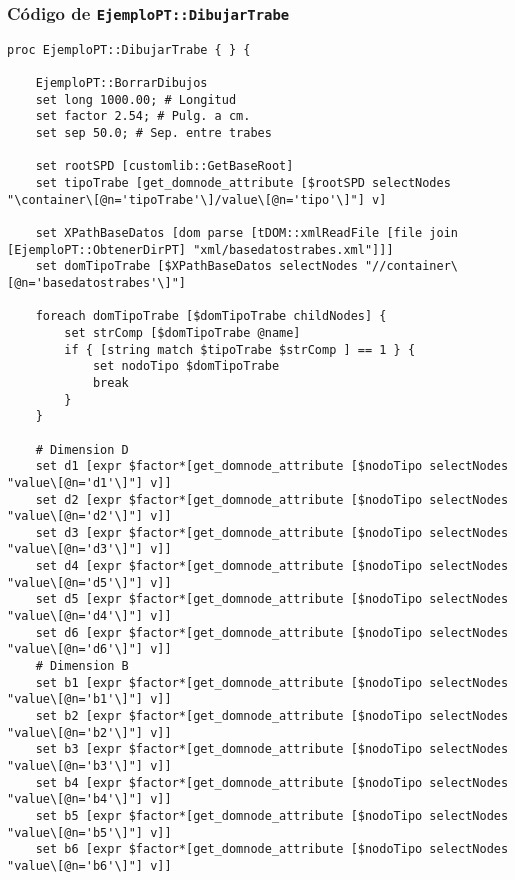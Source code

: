 \documentclass[10pt, a4paper, twocolumn]{article}
\begin{document}
\subsubsection{Código de \texttt{EjemploPT::DibujarTrabe}}
\lstset{language=tcl} 
\begin{lstlisting}[caption={Definición del procedimiento \texttt{EjemploPT::DibujarTrabe}}]
proc EjemploPT::DibujarTrabe { } {
	
	EjemploPT::BorrarDibujos
	set long 1000.00; # Longitud
	set factor 2.54; # Pulg. a cm.
	set sep 50.0; # Sep. entre trabes
	
	set rootSPD [customlib::GetBaseRoot]
	set tipoTrabe [get_domnode_attribute [$rootSPD selectNodes "\container\[@n='tipoTrabe'\]/value\[@n='tipo'\]"] v]
	
	set XPathBaseDatos [dom parse [tDOM::xmlReadFile [file join [EjemploPT::ObtenerDirPT] "xml/basedatostrabes.xml"]]]
	set domTipoTrabe [$XPathBaseDatos selectNodes "//container\[@n='basedatostrabes'\]"]
	
	foreach domTipoTrabe [$domTipoTrabe childNodes] {
		set strComp [$domTipoTrabe @name]
		if { [string match $tipoTrabe $strComp ] == 1 } {
			set nodoTipo $domTipoTrabe
			break
		}
	}
	
	# Dimension D
	set d1 [expr $factor*[get_domnode_attribute [$nodoTipo selectNodes "value\[@n='d1'\]"] v]]
	set d2 [expr $factor*[get_domnode_attribute [$nodoTipo selectNodes "value\[@n='d2'\]"] v]]
	set d3 [expr $factor*[get_domnode_attribute [$nodoTipo selectNodes "value\[@n='d3'\]"] v]]
	set d4 [expr $factor*[get_domnode_attribute [$nodoTipo selectNodes "value\[@n='d5'\]"] v]]
	set d5 [expr $factor*[get_domnode_attribute [$nodoTipo selectNodes "value\[@n='d4'\]"] v]]
	set d6 [expr $factor*[get_domnode_attribute [$nodoTipo selectNodes "value\[@n='d6'\]"] v]]
	# Dimension B
	set b1 [expr $factor*[get_domnode_attribute [$nodoTipo selectNodes "value\[@n='b1'\]"] v]]
	set b2 [expr $factor*[get_domnode_attribute [$nodoTipo selectNodes "value\[@n='b2'\]"] v]]
	set b3 [expr $factor*[get_domnode_attribute [$nodoTipo selectNodes "value\[@n='b3'\]"] v]]
	set b4 [expr $factor*[get_domnode_attribute [$nodoTipo selectNodes "value\[@n='b4'\]"] v]]
	set b5 [expr $factor*[get_domnode_attribute [$nodoTipo selectNodes "value\[@n='b5'\]"] v]]
	set b6 [expr $factor*[get_domnode_attribute [$nodoTipo selectNodes "value\[@n='b6'\]"] v]]
	

\end{lstlisting}
\end{document}

